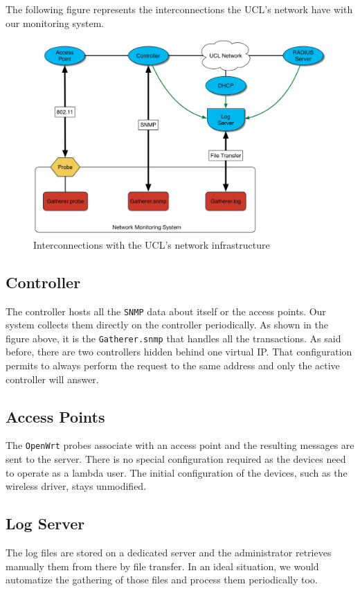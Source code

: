 The following figure represents the interconnections the UCL's network have with our monitoring system.

\begin{figure}[H]
\centering
	\includegraphics[width=.8\linewidth]{Pictures/chapter3/interactions.png}
	\caption{Interconnections with the UCL's network infrastructure}
\end{figure}


\subsection{Controller}
The controller hosts all the \texttt{SNMP} data about itself or the access points. Our system collects them directly on the controller periodically. As shown in the figure above, it is the \texttt{Gatherer.snmp} that handles all the transactions. As said before, there are two controllers hidden behind one virtual IP. That configuration permits to always perform the request to the same address and only the active controller will answer.

\subsection{Access Points}
The \texttt{OpenWrt}  probes associate with an access point and the resulting messages are sent to the server. There is no special configuration required as the devices need to operate as a lambda user. The initial configuration of the devices, such as the wireless driver, stays unmodified.

\subsection{Log Server} 
The log files are stored on a dedicated server and the administrator retrieves manually them from there by file transfer. In an ideal situation, we would automatize the gathering of those files and process them periodically too.

